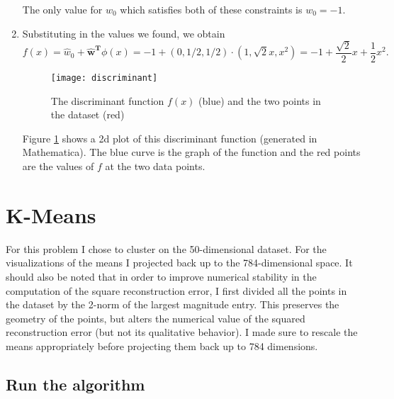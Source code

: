 \documentclass{article}
\begin{document}
\begin{enumerate}
	The only value for $w_0$ which satisfies both of these constraints is $w_0=-1$.
	\item Substituting in the values we found, we obtain
	\[
		f(x) = \hat w_0 + \bm{\hat w^T}\phi(x) = -1 + (0,1/2,1/2)\cdot(1,\sqrt{2}x,x^2) = -1 + \frac{\sqrt{2}}{2}x+\frac12x^2.
	\]
	\begin{figure}
        \centering
        \texttt{[image: discriminant]}
        \caption{The discriminant function $f(x)$ (blue) and the two points in the dataset (red)} 
        \label{fig:discr}
    \end{figure}
    Figure \ref{fig:discr} shows a 2d plot of this discriminant function (generated in Mathematica). The blue curve is the graph of the function and the red points are the values of $f$ at the two data points.
\end{enumerate}


\section{K-Means}
For this problem I chose to cluster on the 50-dimensional dataset. For the visualizations of the means I projected back up to the 784-dimensional space. It should also be noted that in order to improve numerical stability in the computation of the square reconstruction error, I first divided all the points in the dataset by the 2-norm of the largest magnitude entry. This preserves the geometry of the points, but alters the numerical value of the squared reconstruction error (but not its qualitative behavior). I made sure to rescale the means appropriately before projecting them back up to 784 dimensions.

\subsection{Run the algorithm}
\end{document}
